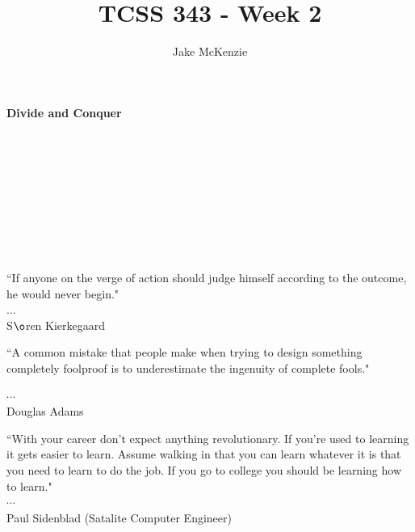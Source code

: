 \documentclass[12pt]{article}
\begin{document}
\title{TCSS 343 - Week 2}
\author{Jake McKenzie}
\maketitle
\noindent\centerline{\textbf{Divide and Conquer}}\\\\\\\\\\\\\\\\
\begin{center}
``If anyone on the verge of action should judge himself according to the outcome, he would never begin." \\$\dots$\\ S$\o$ren Kierkegaard
\end{center}
\begin{center}
    ``A common mistake that people make when trying to design something completely foolproof is to underestimate the ingenuity of complete fools."
\end{center}
\begin{center}
$\cdots$\\
 Douglas Adams
\end{center}
\begin{center}
    ``With your career don't expect anything revolutionary. If you're used to learning it gets easier to learn. Assume walking in that you can learn whatever it is that you need to learn to do the job. If you go to college you should be learning how to learn."\\
    $\cdots$\\
     Paul Sidenblad (Satalite Computer Engineer)
\end{center}
\end{document}
